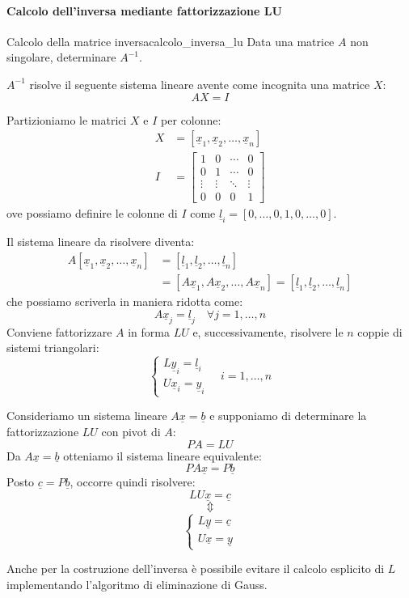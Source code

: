 \documentclass[12pt]{report}
\newcommand{\nmu}{}
\begin{document}
\paragraph{Calcolo dell'inversa mediante fattorizzazione LU} \quad


\begin{assignment}{\nmu Calcolo della matrice inversa}{calcolo_inversa_lu}
Data una matrice $A$ non singolare, determinare $A^{-1}$.
\end{assignment}
\begin{note}{}{}
$A^{-1}$ risolve il seguente sistema lineare avente come incognita una matrice $X$:
\[
AX = I
\]
\end{note}
Partizioniamo le matrici $X$ e $I$ per colonne:
\begin{align*}
X &= [\underline{x}_1, \underline{x}_2, \dots, \underline{x}_n] \\
I &= \begin{bmatrix}
	1 & 0 & \cdots & 0 \\
	0 & 1 & \cdots & 0 \\
	\vdots & \vdots & \ddots & \vdots\\
	0 & 0 & 0 & 1
\end{bmatrix}
\end{align*}
ove possiamo definire le colonne di $I$ come $\underline{l}_i = [0, \dots, 0,1, 0, \dots, 0]$.

Il sistema lineare da risolvere diventa:
\begin{align*}
A[\underline{x}_1, \underline{x}_2, \dots, \underline{x}_n] &= [\underline{l}_1, \underline{l}_2, \dots, \underline{l}_n] \\
&= [A\underline{x}_1, A\underline{x}_2, \dots, A\underline{x}_n] = [\underline{l}_1, \underline{l}_2, \dots, \underline{l}_n]
\end{align*}
che possiamo scriverla in maniera ridotta come:
\[
A\underline{x}_j = \underline{l}_j \quad \forall j=1, \dots, n
\]
Conviene fattorizzare $A$ in forma $LU$ e, successivamente, risolvere le $n$ coppie di sistemi triangolari:
\[
\begin{cases}
	L\underline{y}_i = \underline{l}_i \\
	U\underline{x}_i = \underline{y}_i
\end{cases} \quad i = 1, \dots, n
\]
\begin{note}{}{}
Consideriamo un sistema lineare $A\underline{x} = \underline{b}$ e supponiamo di determinare la fattorizzazione $LU$ con pivot di $A$:
\[
PA = LU
\]
Da $A\underline{x} = \underline{b}$ otteniamo il sistema lineare equivalente:
\[
PA\underline{x} = P\underline{b}
\]
Posto $\underline{c} = P\underline{b}$, occorre quindi risolvere:
\[
LU\underline{x} = \underline{c}
\]
\[
\Updownarrow
\]
\[
\begin{cases}
		L\underline{y} = \underline{c} \\
		U\underline{x} = \underline{y}
	\end{cases}
\]
\end{note}
\begin{note}{}{}
Anche per la costruzione dell'inversa è possibile evitare il calcolo esplicito di $L$ implementando l'algoritmo di eliminazione di Gauss.
\end{note}
\end{document}
